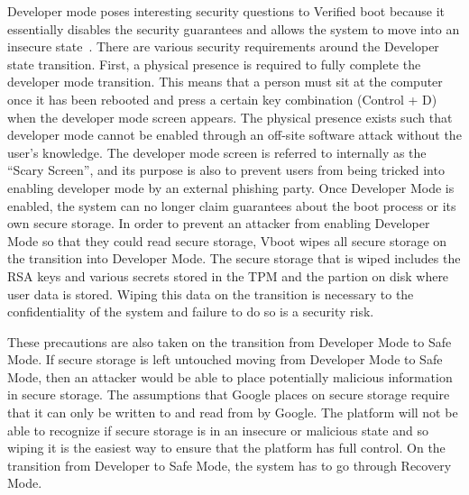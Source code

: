 \documentclass[../report.tex]{subfiles}
\begin{document}
Developer mode poses interesting security questions to Verified boot because it essentially disables the security guarantees and allows the system to move into an insecure state~\cite{developer-mode}. 
There are various security requirements around the Developer state transition.
First, a physical presence is required to fully complete the developer mode transition. 
This means that a person must sit at the computer once it has been rebooted and press a certain key combination (Control + D) when the developer mode screen appears.
The physical presence exists such that developer mode cannot be enabled through an off-site software attack without the user's knowledge.
The developer mode screen is referred to internally as the ``Scary Screen'', and its purpose is also to prevent users from being tricked into enabling developer mode by an external phishing party.
Once Developer Mode is enabled, the system can no longer claim guarantees about the boot process or its own secure storage.
In order to prevent an attacker from enabling Developer Mode so that they could read secure storage, Vboot wipes all secure storage on the transition into Developer Mode.
The secure storage that is wiped includes the RSA keys and various secrets stored in the TPM and the partion on disk where user data is stored.
Wiping this data on the transition is necessary to the confidentiality of the system and failure to do so is a security risk.

These precautions are also taken on the transition from Developer Mode to Safe Mode. 
If secure storage is left untouched moving from Developer Mode to Safe Mode, then an attacker would be able to place potentially malicious information in secure storage.
The assumptions that Google places on secure storage require that it can only be written to and read from by Google.
The platform will not be able to recognize if secure storage is in an insecure or malicious state and so wiping it is the easiest way to ensure that the platform has full control.
On the transition from Developer to Safe Mode, the system has to go through Recovery Mode.
\end{document}
